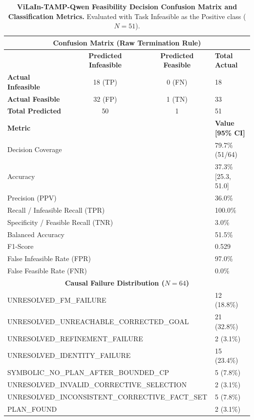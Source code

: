 \begin{table}[t]
\centering
\small
\caption{\textbf{ViLaIn-TAMP-Qwen Feasibility Decision Confusion Matrix and Classification Metrics.}
Evaluated with Task Infeasible as the Positive class ($N=51$).}
\label{tab:vilain_qwen_feasibility}
\begin{tabular}{l|cc|l}
\hline
\multicolumn{4}{c}{\textbf{Confusion Matrix (Raw Termination Rule)}} \\
\hline
& \textbf{Predicted Infeasible} & \textbf{Predicted Feasible} & \textbf{Total Actual} \\
\hline
\textbf{Actual Infeasible} & 18 (TP) & 0 (FN) & 18 \\
\textbf{Actual Feasible}   & 32 (FP) & 1 (TN) & 33 \\
\hline
\textbf{Total Predicted}   & 50 & 1 & 51 \\
\hline
\hline
\multicolumn{3}{l|}{\textbf{Metric}} & \textbf{Value [95\% CI]} \\
\hline
\multicolumn{3}{l|}{Decision Coverage} & 79.7\% (51/64) \\
\multicolumn{3}{l|}{Accuracy} & 37.3\% [25.3, 51.0] \\
\multicolumn{3}{l|}{Precision (PPV)} & 36.0\% \\
\multicolumn{3}{l|}{Recall / Infeasible Recall (TPR)} & 100.0\% \\
\multicolumn{3}{l|}{Specificity / Feasible Recall (TNR)} & 3.0\% \\
\multicolumn{3}{l|}{Balanced Accuracy} & 51.5\% \\
\multicolumn{3}{l|}{F1-Score} & 0.529 \\
\multicolumn{3}{l|}{False Infeasible Rate (FPR)} & 97.0\% \\
\multicolumn{3}{l|}{False Feasible Rate (FNR)} & 0.0\% \\
\hline
\hline
\multicolumn{4}{c}{\textbf{Causal Failure Distribution ($N=64$)}} \\
\hline
\multicolumn{3}{l|}{UNRESOLVED_FM_FAILURE} & 12 (18.8\%) \\
\multicolumn{3}{l|}{UNRESOLVED_UNREACHABLE_CORRECTED_GOAL} & 21 (32.8\%) \\
\multicolumn{3}{l|}{UNRESOLVED_REFINEMENT_FAILURE} & 2 (3.1\%) \\
\multicolumn{3}{l|}{UNRESOLVED_IDENTITY_FAILURE} & 15 (23.4\%) \\
\multicolumn{3}{l|}{SYMBOLIC_NO_PLAN_AFTER_BOUNDED_CP} & 5 (7.8\%) \\
\multicolumn{3}{l|}{UNRESOLVED_INVALID_CORRECTIVE_SELECTION} & 2 (3.1\%) \\
\multicolumn{3}{l|}{UNRESOLVED_INCONSISTENT_CORRECTIVE_FACT_SET} & 5 (7.8\%) \\
\multicolumn{3}{l|}{PLAN_FOUND} & 2 (3.1\%) \\
\hline
\end{tabular}
\end{table}
